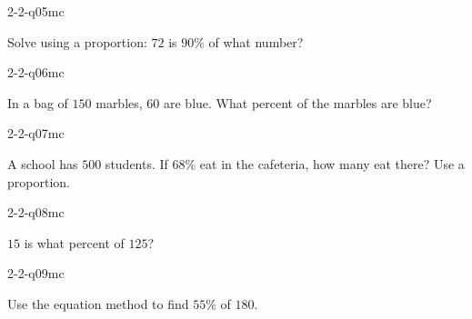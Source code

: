 \begin{practiceQuestion}{2-2-q05}{mc}
\begin{questionText}
Solve using a proportion: $72$ is $90\%$ of what number?
\end{questionText}
\end{practiceQuestion}

\begin{practiceQuestion}{2-2-q06}{mc}
\begin{questionText}
In a bag of $150$ marbles, $60$ are blue. What percent of the marbles are blue?
\end{questionText}
\end{practiceQuestion}

\begin{practiceQuestion}{2-2-q07}{mc}
\begin{questionText}
A school has $500$ students. If $68\%$ eat in the cafeteria, how many eat there? Use a proportion.
\end{questionText}
\end{practiceQuestion}

\begin{practiceQuestion}{2-2-q08}{mc}
\begin{questionText}
$15$ is what percent of $125$?
\end{questionText}
\end{practiceQuestion}

\begin{practiceQuestion}{2-2-q09}{mc}
\begin{questionText}
Use the equation method to find $55\%$ of $180$.
\end{questionText}
\end{practiceQuestion}

